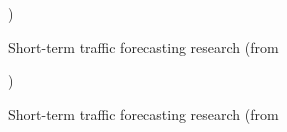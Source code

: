 \begin{figure}[ht]
	\caption{Short-term traffic forecasting research (from \cite{Vlahogianni20143}})
	\label{fig:Vlahogianni201433}
\end{figure}

\begin{figure}[ht]
	\caption{Short-term traffic forecasting research (from \cite{Vlahogianni20143}})
\label{fig:Vlahogianni201434}
\end{figure}

\FloatBarrier
